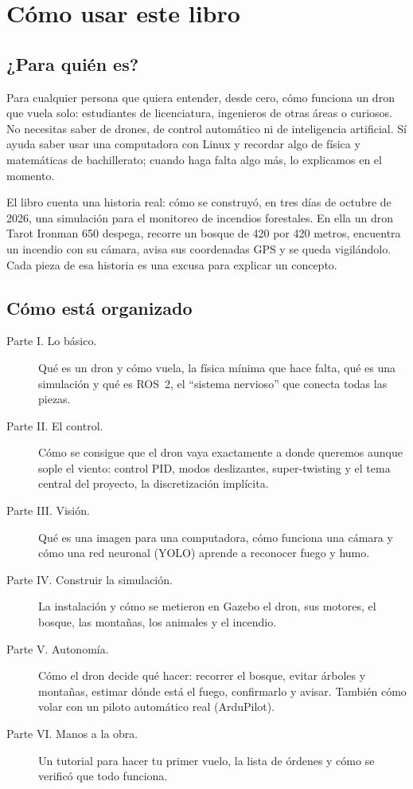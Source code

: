 \chapter{Cómo usar este libro}

\section*{¿Para quién es?}

Para cualquier persona que quiera entender, desde cero, cómo funciona un dron que vuela solo:
estudiantes de licenciatura, ingenieros de otras áreas o curiosos. No
necesitas saber de drones, de control automático ni de inteligencia artificial. Sí ayuda saber
usar una computadora con Linux y recordar algo de física y matemáticas de bachillerato; cuando
haga falta algo más, lo explicamos en el momento.

El libro cuenta una historia real: cómo se construyó, en tres días de octubre de 2026, una
simulación para el monitoreo de incendios forestales. En ella un dron Tarot Ironman 650
despega, recorre un bosque de 420 por 420 metros, encuentra un incendio con su cámara, avisa
sus coordenadas GPS y se queda vigilándolo. Cada pieza de esa historia es una excusa para explicar
un concepto.

\section*{Cómo está organizado}

\begin{description}
  \item[Parte I. Lo básico.] Qué es un dron y cómo vuela, la física mínima que hace falta, qué es
        una simulación y qué es ROS~2, el ``sistema nervioso'' que conecta todas las piezas.
  \item[Parte II. El control.] Cómo se consigue que el dron vaya exactamente a donde queremos aunque
        sople el viento: control PID, modos deslizantes, super-twisting y el tema central del
        proyecto, la discretización implícita.
  \item[Parte III. Visión.] Qué es una imagen para una computadora, cómo funciona una cámara y cómo
        una red neuronal (YOLO) aprende a reconocer fuego y humo.
  \item[Parte IV. Construir la simulación.] La instalación y cómo se metieron en Gazebo el dron, sus
        motores, el bosque, las montañas, los animales y el incendio.
  \item[Parte V. Autonomía.] Cómo el dron decide qué hacer: recorrer el bosque, evitar árboles y
        montañas, estimar dónde está el fuego, confirmarlo y avisar. También cómo volar con un
        piloto automático real (ArduPilot).
  \item[Parte VI. Manos a la obra.] Un tutorial para hacer tu primer vuelo, la lista de órdenes y
        cómo se verificó que todo funciona.
\end{description}

